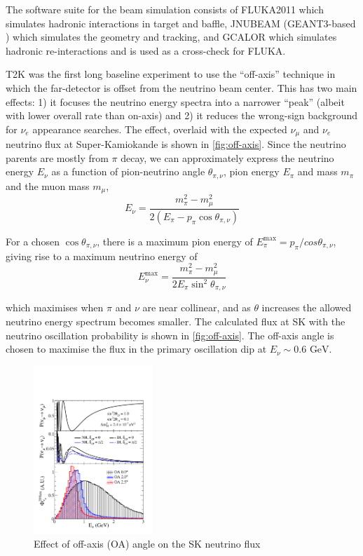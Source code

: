 The software suite for the beam simulation consists of FLUKA2011 \cite{fluka2008_1, fluka2008_2, fluka2011} which simulates hadronic interactions in target and baffle, JNUBEAM (GEANT3-based \cite{geant3}) which simulates the geometry and tracking, and GCALOR \cite{gcalor} which simulates hadronic re-interactions and is used as a cross-check for FLUKA\cite{t2k_beam, t2k_tn_flux}.

T2K was the first long baseline experiment to use the ``off-axis'' technique\cite{off_axis} in which the far-detector is offset from the neutrino beam center. This has two main effects: 1) it focuses the neutrino energy spectra into a narrower ``peak'' (albeit with lower overall rate than on-axis) and 2) it reduces the wrong-sign background for $\nu_e$ appearance searches. The effect, overlaid with the expected $\nu_\mu$ and $\nu_e$ neutrino flux at Super-Kamiokande is shown in \autoref{fig:off-axis}. Since the neutrino parents are mostly from $\pi$ decay, we can approximately express the neutrino energy $E_\nu$ as a function of pion-neutrino angle $\theta_{\pi,\nu}$, pion energy $E_\pi$ and mass $m_\pi$ and the muon mass $m_\mu$,
\begin{equation}
	E_\nu = \frac{m^2_\pi-m^2_\mu}{2\left( E_\pi - p_\pi \cos \theta_{\pi,\nu} \right)} 
\end{equation}

For a chosen $\cos \theta_{\pi,\nu}$, there is a maximum pion energy of $E_\pi^\text{max} = p_\pi/cos\theta_{\pi,\nu}$, giving rise to a maximum neutrino energy of
\begin{equation}
	E_\nu^\text{max} = \frac{m^2_\pi-m^2_\mu}{2E_\pi \sin^2 \theta_{\pi,\nu}} 
\end{equation}

which maximises when $\pi$ and $\nu$ are near collinear, and as $\theta$ increases the allowed neutrino energy spectrum becomes smaller. The calculated flux at SK with the neutrino oscillation probability is shown in \autoref{fig:off-axis}. The off-axis angle is chosen to maximise the flux in the primary oscillation dip at $E_\nu \sim 0.6\text{ GeV}$.
\begin{figure}[h]
	\includegraphics[width=0.4\textwidth, trim={0mm 0mm 0mm 0mm}, clip,page=1]{figures/det_chap/oaeffect_pnue_pnumu_flux}
	\caption{Effect of off-axis (OA) angle on the SK neutrino flux}
	\label{fig:off-axis}
\end{figure}

